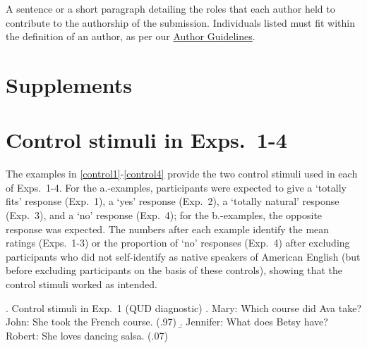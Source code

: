 \documentclass[times,linguex,xcolor]{glossa}
\begin{document}
A sentence or a short paragraph detailing the roles that each author held to contribute to the authorship of the submission.  Individuals listed must fit within the definition of an author, as per our \href{https://www.glossa-journal.org/site/author-guidelines/}{Author Guidelines}.

\nocite{*} %



\appendix

\setcounter{table}{0}
\renewcommand{\thetable}{A\arabic{table}}

\setcounter{figure}{0}
\renewcommand{\thefigure}{A\arabic{figure}}

\setcounter{ExNo}{0}


\section*{Supplements}

\section{Control stimuli in Exps.~1-4}\label{supp:stims}

The examples in \ref{control1}-\ref{control4} provide the two control stimuli used in each of Exps.~1-4. For the a.-examples, participants were expected to give a `totally fits' response (Exp.~1), a `yes' response (Exp.~2), a `totally natural' response (Exp.~3), and a `no' response (Exp.~4); for the b.-examples, the opposite response was expected. The numbers  after each example identify the mean ratings (Exps.~1-3) or the proportion of `no' responses (Exp.~4) after excluding participants who did not self-identify as native speakers of American English (but before excluding participants on the basis of these controls), showing that the control stimuli worked as intended.

\ex.\label{control1} Control stimuli in Exp.~1 (QUD diagnostic)
\a. Mary: Which course did Ava take?
\\ John: She took the French course. (.97)
\b. Jennifer: What does Betsy have?
\\ Robert: She loves dancing salsa. (.07)
\end{document}

